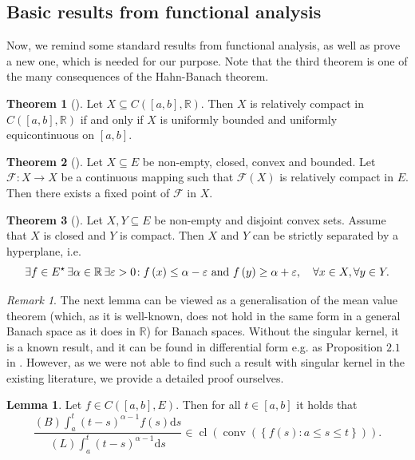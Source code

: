\documentclass[reqno]{amsart}
\numberwithin{equation}{section}
\theoremstyle{definition}
\newtheorem{lemma}{Lemma}
\newtheorem{theorem}{Theorem}
\theoremstyle{remark}
\newtheorem{remark}{Remark}
\newcommand{\Bint}[3]{\br{B}\!\displaystyle\int_{#1}^{#2}{#3}}
\newcommand{\br}[1]{\left(#1\right)}
\newcommand{\C}[2]{C\br{#1,#2}}
\newcommand{\cbr}[1]{\left\{#1\right\}}
\newcommand{\cl}[1]{\clOperator\br{#1}}
\newcommand{\conv}[1]{\convOperator\br{#1}}
\newcommand{\ds}{\mathrm{d}s}
\newcommand{\eps}{\varepsilon}
\newcommand{\fF}{\mathcal{F}}
\newcommand{\Lint}[3]{\br{L}\!\displaystyle\int_{#1}^{#2}{#3}}
\newcommand{\R}{\mathbb{R}}
\newcommand{\sbr}[1]{\left[#1\right]}
\newcommand{\sE}{E^{\star}}
\newcommand{\st}{\!:}
\DeclareMathOperator{\clOperator}{cl}
\DeclareMathOperator{\convOperator}{conv}
\begin{document}
	\subsection{Basic results from functional analysis}
	Now, we remind some standard results from functional analysis, as well as prove a new one, which is needed for our purpose. Note that the third theorem is one of the many consequences of the Hahn-Banach theorem.
	\begin{theorem}[]\label{thm_10}
		Let $X\subseteq\C{\sbr{a,b}}{\R}$. Then $X$ is relatively compact in $\C{\sbr{a,b}}{\R}$ if and only if $X$ is uniformly bounded and uniformly equicontinuous on $\sbr{a,b}$.
	\end{theorem}
	\begin{theorem}[]\label{thm_11}
		Let $X\subseteq{E}$ be non-empty, closed, convex and bounded. Let $\fF\st{X}\rightarrow{X}$ be a continuous mapping such that $\fF\br{X}$ is relatively compact in $E$. Then there exists a fixed point of $\fF$ in $X$.
	\end{theorem}
	\begin{theorem}[]\label{thm_12}
		Let $X,Y\subseteq{E}$ be non-empty and disjoint convex sets. Assume that $X$ is closed and $Y$ is compact. Then $X$ and $Y$ can be strictly separated by a hyperplane, i.e.
		\begin{equation*}
			\exists{f}\in\sE\,\exists{\alpha}\in\R\,\exists\eps>0\st{f}\br{x}\leq\alpha-\eps\textnormal{ and }f\br{y}\geq\alpha+\eps,\quad\forall{x}\in{X},\forall{y}\in{Y}.
		\end{equation*}
	\end{theorem}
	\begin{remark}
		The next lemma can be viewed as a generalisation of the mean value theorem (which, as it is well-known, does not hold in the same form in a general Banach space as it does in $\R$) for Banach spaces. Without the singular kernel, it is a known result, and it can be found in differential form e.g. as Proposition $2.1$ in \cite{Deimling}. However, as we were not able to find such a result with singular kernel in the existing literature, we provide a detailed proof ourselves.
	\end{remark}
	\begin{lemma}\label{lm_01}
		Let $f\in\C{\sbr{a,b}}{E}$. Then for all $t\in\sbr{a,b}$ it holds that
		\begin{equation}\label{eq_02_12}
			\frac{\Bint{a}{t}{\br{t-s}^{\alpha-1}f\br{s}\ds}}{\Lint{a}{t}{\br{t-s}^{\alpha-1}\ds}}\in\cl{\conv{\cbr{f\br{s}\st{a}\leq{s}\leq{t}}}}.
		\end{equation}
	\end{lemma}
\end{document}
